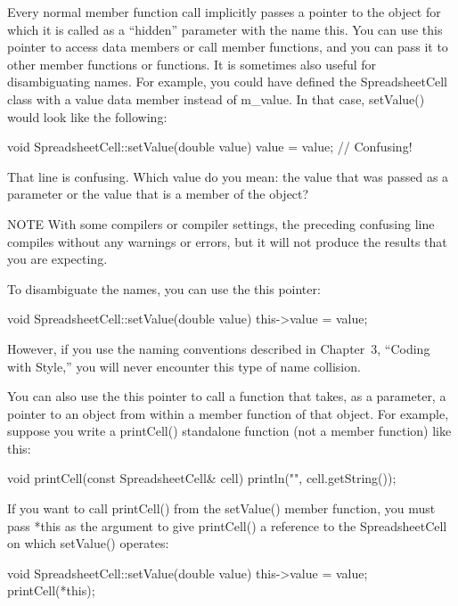 
Every normal member function call implicitly passes a pointer to the object for which it is called as a “hidden” parameter with the name this. You can use this pointer to access data members or call member functions, and you can pass it to other member functions or functions. It is sometimes also useful for disambiguating names. For example, you could have defined the SpreadsheetCell class with a value data member instead of m\_value. In that case, setValue() would look like the following:

\begin{cpp}
void SpreadsheetCell::setValue(double value)
{
    value = value; // Confusing!
}
\end{cpp}

That line is confusing. Which value do you mean: the value that was passed as a parameter or the value that is a member of the object?

\begin{myNotic}{NOTE}
With some compilers or compiler settings, the preceding confusing line compiles without any warnings or errors, but it will not produce the results that you are expecting.
\end{myNotic}

To disambiguate the names, you can use the this pointer:

\begin{cpp}
void SpreadsheetCell::setValue(double value)
{
    this->value = value;
}
\end{cpp}

However, if you use the naming conventions described in Chapter 3, “Coding with Style,” you will never encounter this type of name collision.

You can also use the this pointer to call a function that takes, as a parameter, a pointer to an object from within a member function of that object. For example, suppose you write a printCell() standalone function (not a member function) like this:

\begin{cpp}
void printCell(const SpreadsheetCell& cell)
{
    println("{}", cell.getString());
}
\end{cpp}

If you want to call printCell() from the setValue() member function, you must pass *this as the argument to give printCell() a reference to the SpreadsheetCell on which setValue() operates:

\begin{cpp}
void SpreadsheetCell::setValue(double value)
{
    this->value = value;
    printCell(*this);
}
\end{cpp}

